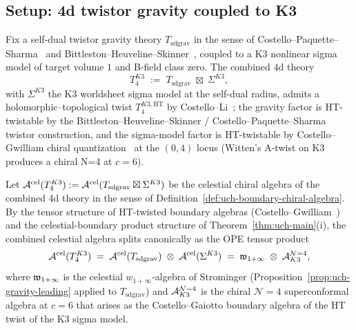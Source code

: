 \subsection{Setup: 4d twistor gravity coupled to K3}
\label{subsec:cmb-setup}

Fix a self-dual twistor gravity theory $T_{\mathrm{sd grav}}$ in the
sense of Costello--Paquette--Sharma~\cite{CostelloPaquetteSharmaCelestial}
and Bittleston--Heuveline--Skinner~\cite{BittlestonHeuvelineSkinner},
coupled to a K3 nonlinear sigma model of target volume $1$ and
B-field class zero. The combined $4$d theory
\begin{equation}
\label{eq:cmb-combined-theory}
T_4^{K3}
\;:=\;
T_{\mathrm{sd grav}} \;\boxtimes\; \Sigma^{K3},
\end{equation}
with $\Sigma^{K3}$ the K3 worldsheet sigma model at the self-dual
radius, admits a holomorphic--topological twist $T_4^{K3,\mathrm{HT}}$
by Costello--Li~\cite{CostelloLiTwistedSugra}; the gravity factor is
HT-twistable by the Bittleston--Heuveline--Skinner / Costello--Paquette--Sharma
twistor construction, and the sigma-model factor is HT-twistable by
Costello--Gwilliam chiral quantization~\cite{CostelloGwilliamVolI,
CostelloGwilliamVolII} at the $(0,4)$ locus (Witten's A-twist on K3
produces a chiral N=4 at $c=6$).

\begin{definition}
\label{def:cmb-combined-cel-algebra}
Let $\mathcal A^{\mathrm{cel}}(T_4^{K3}) := \mathcal A^{\mathrm{cel}}(T_{\mathrm{sd grav}} \boxtimes \Sigma^{K3})$
be the celestial chiral algebra of the combined 4d theory in the sense
of Definition~\ref{def:uch-boundary-chiral-algebra}. By the tensor
structure of HT-twisted boundary algebras
(Costello--Gwilliam~\cite[\S 4]{CostelloGwilliamVolII}) and the
celestial-boundary product structure of
Theorem~\ref{thm:uch-main}(i), the combined celestial algebra splits
canonically as the OPE tensor product
\begin{equation}
\label{eq:cmb-tensor-decomposition}
\mathcal A^{\mathrm{cel}}(T_4^{K3})
\;=\;
\mathcal A^{\mathrm{cel}}(T_{\mathrm{sd grav}}) \;\otimes\; \mathcal A^{\mathrm{cel}}(\Sigma^{K3})
\;=\;
\mathfrak w_{1+\infty} \;\otimes\; \mathcal A^{\mathcal{N}{=}4}_{K3},
\end{equation}
where $\mathfrak w_{1+\infty}$ is the celestial $w_{1+\infty}$-algebra of Strominger
(Proposition~\ref{prop:uch-gravity-leading} applied to
$T_{\mathrm{sd grav}}$) and $\mathcal A^{\mathcal{N}{=}4}_{K3}$ is the chiral
$\mathcal{N}{=}4$ superconformal algebra at $c = 6$ that arises as the
Costello--Gaiotto boundary algebra of the HT twist of the K3 sigma
model.
\end{definition}

